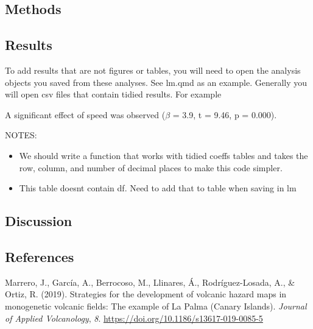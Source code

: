 \documentclass[
]{agujournal2019}
\providecommand{\tightlist}{%
  \setlength{\itemsep}{0pt}\setlength{\parskip}{0pt}}\usepackage{longtable,booktabs,array}
\newlength{\cslhangindent}
\newenvironment{CSLReferences}[2] %
 {\begin{list}{}{%
  \setlength{\itemindent}{0pt}
  \setlength{\leftmargin}{0pt}
  \setlength{\parsep}{0pt}
  \ifodd #1
   \setlength{\leftmargin}{\cslhangindent}
   \setlength{\itemindent}{-1\cslhangindent}
  \fi
  \setlength{\itemsep}{#2\baselineskip}}}
 {\end{list}}
\begin{document}
\subsection{Methods}\label{sec-methods}

\subsection{Results}\label{sec-results}

To add results that are not figures or tables, you will need to open the
analysis objects you saved from these analyses. See lm.qmd as an
example. Generally you will open csv files that contain tidied results.
For example

A significant effect of speed was observed (\(\beta\) = 3.9, t = 9.46, p
= 0.000).

NOTES:

\begin{itemize}
\tightlist
\item
  We should write a function that works with tidied coeffs tables and
  takes the row, column, and number of decimal places to make this code
  simpler.
\item
  This table doesnt contain df. Need to add that to table when saving in
  lm
\end{itemize}

\subsection{Discussion}\label{sec-discussion}

\subsection*{References}\label{references-1}

\label{refs}
\begin{CSLReferences}{1}{0}
\vspace{1em}

Marrero, J., García, A., Berrocoso, M., Llinares, Á., Rodríguez-Losada,
A., \& Ortiz, R. (2019). Strategies for the development of volcanic
hazard maps in monogenetic volcanic fields: The example of {La} {Palma}
({Canary} {Islands}). \emph{Journal of Applied Volcanology}, \emph{8}.
\url{https://doi.org/10.1186/s13617-019-0085-5}

\end{CSLReferences}
\end{document}

